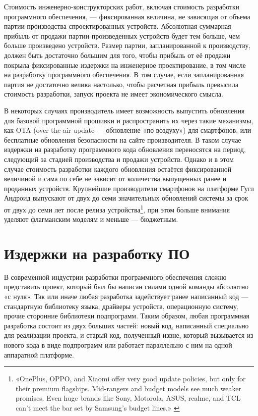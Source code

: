 \documentclass{article}
\begin{document}
Стоимость инженерно-конструкторских работ, включая стоимость разработки программного обеспечения, — фиксированная величина, не зависящая от объема партии производства спроектированных устройств. Абсолютная суммарная прибыль от продажи партии произведенных устройств будет тем больше, чем больше произведено устройств. Размер партии, запланированной к производству, должен быть достаточно большим для того, чтобы прибыль от её продажи покрыла фиксированные издержки на инженерное проектирование, в том числе на разработку программного обеспечения. В том случае, если запланированная партия не достаточно велика настолько, чтобы расчетная прибыль превысила стоимость разработки, запуск проекта не имеет экономического смысла.

В некоторых случаях производитель имеет возможность выпустить обновления для базовой программной прошивки и распространить их через такие механизмы, как OTA (over the air update — обновление «по воздуху») для смартфонов, или бесплатные обновления безопасности на сайте производителя. В таком случае издержки на разработку программного кода обновления переносятся на период, следующий за стадией производства и продажи устройств. Однако и в этом случае стоимость разработки каждого обновления остаётся фиксированной величиной и сама по себе не зависит от количества выпущенных ранее и проданных устройств. Крупнейшие производители смартфонов на платформе Гугл Андроид выпускают от двух до семи значительных обновлений системы за срок от двух до семи лет после релиза устройства\footnote{«OnePlus, OPPO, and Xiaomi offer very good update policies, but only for their premium flagships. Mid-rangers and budget models see much weaker promises. Even huge brands like Sony, Motorola, ASUS, realme, and TCL can’t meet the bar set by Samsung’s budget lines.» \cite{phoneUpdates}}, при этом больше внимания уделяют флагманским моделям и меньше — бюджетным.

\section*{Издержки на разработку ПО}

В современной индустрии разработки программного обеспечения сложно представить проект, который был бы написан силами одной команды абсолютно «с нуля». Так или иначе любая разработка задействует ранее написанный код — стандартную библиотеку языка, драйверы устройств, операционную систему, прочие сторонние библиотеки подпрограмм. Таким образом, любая программная разработка состоит из двух больших частей: новый код, написанный специально для реализации проекта, и старый код, полученный извне, который вызывается из нового кода в виде подпрограмм или работает параллельно с ним на одной аппаратной платформе.
\end{document}

